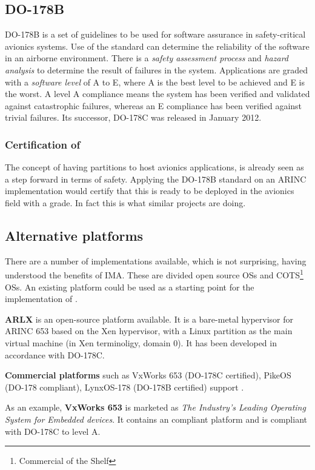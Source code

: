 \subsection{DO-178B}
DO-178B\cite{do178b_wiki} is a set of guidelines to be used for
software assurance in safety-critical avionics systems.
Use of the standard can determine the reliability of the software in an airborne environment.
There is a \textit{safety assessment process} and \textit{hazard analysis} to determine the result of failures in the system.
Applications are graded with a \textit{software level} of A to E,
where A is the best level to be achieved and E is the worst.
A level A compliance means the system has been verified and validated against catastrophic failures,
whereas an E compliance has been verified against trivial failures.
Its successor, DO-178C\cite{do178c_wiki} was released in January 2012.

\subsubsection{Certification of \arinc{}}
The concept of having partitions
to host avionics applications, is already seen as a step
forward in terms of safety.
Applying the DO-178B standard on an ARINC implementation would certify
that this is ready to be deployed in the avionics field with a grade.
In fact this is what similar projects are doing.

\subsection{Alternative \arinc{} platforms}
There are a number of \arinc{} implementations available, which is not
surprising, having understood the benefits of IMA.
These are divided open source OSs and COTS\footnote{Commercial of the Shelf} OSs.
An existing platform could be used as a starting point for
the implementation of \OSname{}.

\textbf{ARLX}\cite{arlx}
is an open-source platform available. It is a bare-metal hypervisor 
for ARINC 653 based on the Xen hypervisor, with a Linux partition as the main
virtual machine (in Xen terminoligy, domain 0).
It has been developed in accordance with DO-178C.

\textbf{Commercial platforms}
such as VxWorks 653 (DO-178C certified)\cite{vxworks},
PikeOS (DO-178 compliant)\cite{pikeos},
LynxOS-178 (DO-178B certified)\cite{linxos}
support \arinc{}.

As an example, \textbf{VxWorks 653}
is marketed as \textit{The Industry's Leading Operating System for Embedded devices}\cite{vxworks}.
It contains an \arinc{} compliant platform and is compliant with DO-178C to level A.

